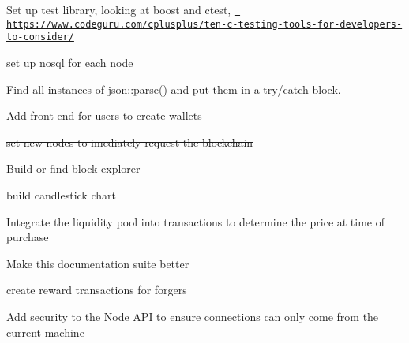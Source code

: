 
\begin{DoxyItemize}
\item Set up test library, looking at boost and ctest, \href{https://www.codeguru.com/cplusplus/ten-c-testing-tools-for-developers-to-consider/}{\texttt{ https\+://www.\+codeguru.\+com/cplusplus/ten-\/c-\/testing-\/tools-\/for-\/developers-\/to-\/consider/}}
\item set up nosql for each node
\item Find all instances of json\+::parse() and put them in a try/catch block.
\item Add front end for users to create wallets
\item \sout{set new nodes to imediately request the blockchain}
\item Build or find block explorer
\item build candlestick chart
\item Integrate the liquidity pool into transactions to determine the price at time of purchase
\item Make this documentation suite better
\item create reward transactions for forgers
\item Add security to the \mbox{\hyperlink{class_node}{Node}} API to ensure connections can only come from the current machine 
\end{DoxyItemize}